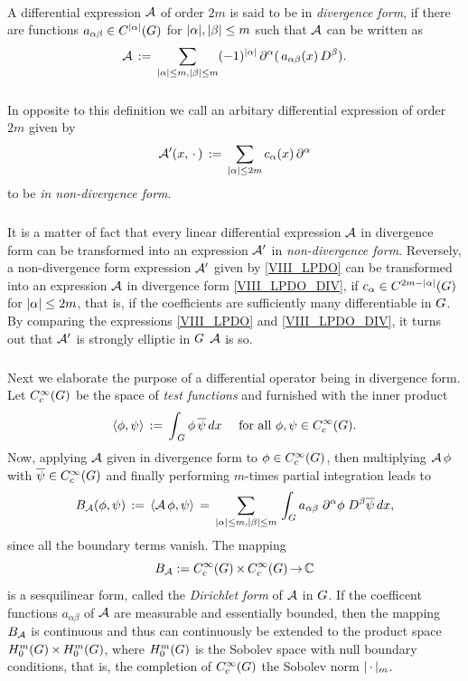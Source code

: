 \documentclass[11pt,twoside]{article}
\begin{document}
\paragraph*{} %
A differential expression ${\mathcal{A}}$ of order $2m$
is said to be in \textit{divergence form},
if there are functions $a_{\alpha \beta} \in C^{\abs{\alpha} }(\G)$
for $\abs{\alpha} , \abs{\beta} \leq m$
such that ${\mathcal{A}}$ can be written as
\begin{equation}\label{VIII_LPDO_DIV}
\A \eqdef
\sum_{\abs{\alpha} \leq m, \abs{\beta} \leq m} (-1)^{\abs{\alpha} } \,
\PA(\,a_{\alpha \beta}(x) \, D^{\beta}).
\end{equation}

\subparagraph*{}
In opposite to this definition we call an arbitary differential expression
of order $2m$ given by
\begin{equation}\label{VIII_LPDO}
\A'(x,\,\cdot\,) \eqdef
\sum_{\abs{\alpha} \leq 2m} c_{\alpha}(x) \, \PA
\end{equation}
to be \textit{in non-divergence form}.

\subparagraph*{}
It is a matter of fact
that every linear differential expression ${\mathcal{A}}$ in divergence form
can be transformed into an expression ${\mathcal{A}}'$ in \textit{non-divergence form}.
Reversely,
a non-divergence form expression ${\mathcal{A}}'$ given by \eqref{VIII_LPDO}
can be transformed into an expression ${\mathcal{A}}$ in divergence form \eqref{VIII_LPDO_DIV},
if $c_{\alpha} \in C^{2m - \abs{\alpha} }(\G)$ for $\abs{\alpha} \leq 2m$,
that is,
if the coefficients are sufficiently many differentiable in $G$.
By comparing the expressions \eqref{VIII_LPDO} and \eqref{VIII_LPDO_DIV},
it turns out that
${\mathcal{A}}'$ is strongly elliptic in $G$ \iff ${\mathcal{A}}$ is so.

\subparagraph*{}
Next we elaborate the purpose of a differential operator
being in divergence form.
Let $C_c^{\infty}(G)$ be the space of \textit{test functions}
and furnished with the inner product
\[
\langle \phi,\psi \rangle \,:=\,
\int_{\,G} \phi \, \overline{\psi} \,dx \quad \mbox{ for all } \phi,\psi \in C_c^{\infty}(G).
\]
Now,
applying ${\mathcal{A}}$ given in divergence form to $\phi \in C_c^{\infty}(G)$,
then multiplying ${\mathcal{A}} \, \phi$ with $\overline{\psi} \in C_c^{\infty}(G)$ and
finally performing $m$-times partial integration leads to
\begin{equation}\label{DIRICHLET_FORM}
\DF_{\A}(\phi,\psi) \eqdef \scalar{\A \, \phi}{\psi} \=
\sum_{\abs{\alpha} \leq m, \abs{\beta} \leq m} \,
\int_{\G}
a_{\alpha \beta} \; \PA \phi \; D^{\beta} \overline{\psi}
\, dx,
\end{equation}
since all the boundary terms vanish.
The mapping
\[
B_{{\mathcal{A}}} := C_c^{\infty}(G) {\,\times\,} C_c^{\infty}(G) {\,\to\,} {\mathbb{C}}
\]
is a sesquilinear form,
called the \textit{Dirichlet form} of ${\mathcal{A}}$ in $G$.
If the coefficent functions $a_{\alpha \beta}$ of ${\mathcal{A}}$
are measurable and essentially bounded,
then the mapping $B_{{\mathcal{A}}}$ is continuous
and thus can continuously be extended to the product space
$H_0^{m}(G) {\,\times\,} H_0^{m}(G)$,
where $H_0^{m}(G)$ is the Sobolev space with null boundary conditions,
that is,
the completion of $C_c^{\infty}(G)$ {\wrt} the Sobolev norm $\abs{\,\cdot\,} _m$.
\end{document}
